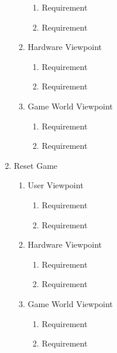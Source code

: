 \documentclass[]{article}
\begin{document}
\begin{enumerate}[{BE}1.]
\begin{enumerate}[{VP7}.1]
			\begin{enumerate}
				\item Requirement
				\item Requirement
			\end{enumerate}
		\item Hardware Viewpoint
			\begin{enumerate}
				\item Requirement
				\item Requirement
			\end{enumerate}
		\item Game World Viewpoint
			\begin{enumerate}
				\item Requirement
				\item Requirement
			\end{enumerate}
	\end{enumerate}
		\item Reset Game
	\begin{enumerate}[{VP9}.1]
		\item User Viewpoint
			\begin{enumerate}
				\item Requirement
				\item Requirement
			\end{enumerate}
		\item Hardware Viewpoint
			\begin{enumerate}
				\item Requirement
				\item Requirement
			\end{enumerate}
		\item Game World Viewpoint
			\begin{enumerate}
				\item Requirement
				\item Requirement
			\end{enumerate}
			

\end{enumerate}
\end{enumerate}
\end{document}
